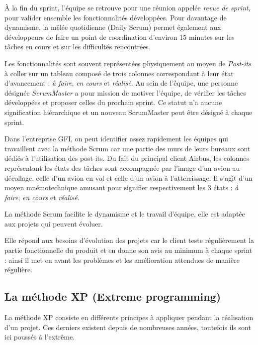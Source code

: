 À la fin du sprint, l'équipe se retrouve pour une réunion appelée \textit{revue de sprint}, pour valider ensemble les fonctionnalités développées.
Pour davantage de dynamisme, la mêlée quotidienne (Daily Scrum) permet également aux développeurs de faire un point de coordination d'environ 15 minutes sur les tâches en cours et sur les difficultés rencontrées.


Les fonctionnalités sont souvent représentées physiquement au moyen de \textit{Post-its} à coller sur un tableau composé de trois colonnes correspondant à leur état d'avancement : \textit{à faire}, \textit{en cours} et \textit{réalisé}. Au sein de l'équipe, une personne désignée \textit{ScrumMaster} a pour mission de motiver l'équipe, de vérifier les tâches développées et proposer celles du prochain sprint. Ce statut n'a aucune signification hiérarchique et un nouveau ScrumMaster peut être désigné à chaque sprint.

\begin{app}
Dans l'entreprise GFI, on peut identifier assez rapidement les équipes qui travaillent avec la méthode Scrum car une partie des murs de leurs bureaux sont dédiés à l'utilisation des post-its. Du fait du principal client Airbus, les colonnes représentant les états des tâches sont accompagnée par l'image d'un avion au décollage, celle d'un avion en vol et celle d'un avion à l'atterrissage. Il s'agit d'un moyen mnémotechnique amusant pour signifier respectivement les 3 états : \textit{à faire}, \textit{en cours} et \textit{réalisé}.
\end{app}

La méthode Scrum facilite le dynamisme et le travail d'équipe, elle est adaptée aux projets qui peuvent évoluer.

Elle répond aux besoins d'évolution des projets car le client teste régulièrement la partie fonctionnelle du produit et en donne son avis au minimum à chaque sprint : ainsi il met en avant les problèmes et les amélioration attendues de manière régulière.

\subsection{La méthode XP (Extreme programming)}

La méthode XP consiste en différents principes à appliquer pendant la réalisation d'un projet. Ces derniers existent depuis de nombreuses années, toutefois ils sont ici poussés à l'extrême.

